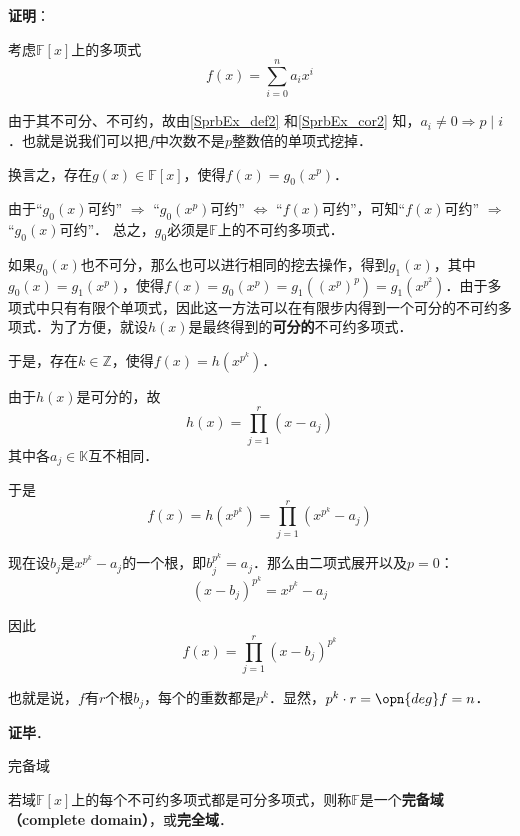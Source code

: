 \textbf{证明}：

考虑$\mathbb{F}[x]$上的多项式
\begin{equation}
f(x) = \sum_{i=0}^n a_ix^i
\end{equation}


由于其不可分、不可约，故由\autoref{SprbEx_def2} 和\autoref{SprbEx_cor2} 知，$a_i\neq 0 \Rightarrow p\mid i$．也就是说我们可以把$f$中次数不是$p$整数倍的单项式挖掉．

换言之，存在$g(x)\in\mathbb{F}[x]$，使得$f(x)=g_0(x^p)$．

由于“$g_0(x)$可约” $\Rightarrow$ “$g_0(x^p)$可约” $\iff$ “$f(x)$可约”，可知“$f(x)$可约” $\Rightarrow$ “$g_0(x)$可约”． 总之，$g_0$必须是$\mathbb{F}$上的不可约多项式．

如果$g_0(x)$也不可分，那么也可以进行相同的挖去操作，得到$g_1(x)$，其中$g_0(x) = g_1(x^p)$，使得$f(x) = g_0(x^p) = g_1((x^p)^p) = g_1(x^{p^2})$．由于多项式中只有有限个单项式，因此这一方法可以在有限步内得到一个可分的不可约多项式．为了方便，就设$h(x)$是最终得到的\textbf{可分的}不可约多项式．

于是，存在$k\in\mathbb{Z}$，使得$f(x) = h(x^{p^k})$．

由于$h(x)$是可分的，故
\begin{equation}
h(x) = \prod_{j=1}^{r}(x-a_j)
\end{equation}
其中各$a_j\in\mathbb{K}$互不相同．

于是
\begin{equation}
f(x) = h(x^{p^k}) = \prod_{j=1}^{r}(x^{p^k}-a_j)
\end{equation}

现在设$b_j$是$x^{p^k}-a_j$的一个根，即$b_j^{p^k}=a_j$．那么由二项式展开以及$p=0$：
\begin{equation}
(x-b_j)^{p^k} = x^{p^k}-a_j
\end{equation}

因此
\begin{equation}
f(x) = \prod_{j=1}^{r} (x-b_j)^{p^k}
\end{equation}

也就是说，$f$有$r$个根$b_j$，每个的重数都是$p^k$．显然，$p^k\cdot r = \opn{deg}f = n$．

\textbf{证毕}．


\begin{definition}{完备域}\label{SprbEx_def3}

若域$\mathbb{F}[x]$上的每个不可约多项式都是可分多项式，则称$\mathbb{F}$是一个\textbf{完备域（complete domain）}，或\textbf{完全域}．


\end{definition}

